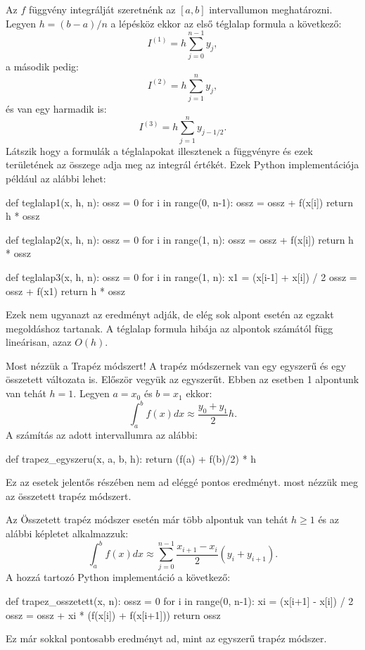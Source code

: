 Az
\(f\) függvény integrálját szeretnénk az \([a ,b]\) intervallumon meghatározni. Legyen
\(h=(b - a)/n\) a lépésköz ekkor az első téglalap formula a következő:
\[
I^{(1)}= h  \sum^{n-1}_{j=0}y_j,
\]
a második pedig:
\[
I^{(2)}= h  \sum^{n}_{j=1}y_j,
\]
és van egy harmadik is:
\[
I^{(3)}= h  \sum^{n}_{j=1}y_{j-1/2}.
\]
Látszik hogy a formulák a téglalapokat illesztenek a függvényre és ezek
területének az összege adja meg az integrál értékét.
Ezek Python implementációja például az alábbi lehet:
\begin{python}
def teglalap1(x, h, n):
    ossz = 0
    for i in range(0, n-1):
        ossz = ossz + f(x[i])
    return h * ossz

def teglalap2(x, h, n):
    ossz = 0
    for i in range(1, n):
        ossz = ossz + f(x[i])
    return h * ossz

def teglalap3(x, h, n):
    ossz = 0
    for i in range(1, n):
        x1 = (x[i-1] + x[i]) / 2
        ossz = ossz + f(x1)
    return h * ossz
\end{python}    
    Ezek nem ugyanazt az eredményt adják, de elég sok alpont esetén
az egzakt megoldáshoz tartanak. A téglalap formula hibája az alpontok
számától függ lineárisan, azaz \(O(h)\).

    Most nézzük a Trapéz módszert! A trapéz módszernek van egy egyszerű és
egy összetett változata is. Először vegyük az egyszerűt. Ebben az
esetben 1 alpontunk van tehát \(h=1\). Legyen \(a=x_0\) és \(b=x_1\)
ekkor: \[
\int^b_a f(x)dx \approx \frac{y_0+y_1}{2}h.
\]
A számítás az adott intervallumra az alábbi:
\begin{python}
def trapez_egyszeru(x, a, b, h):  
    return (f(a) + f(b)/2) * h
\end{python}
    Ez az esetek jelentős részében nem ad eléggé pontos eredményt. most nézzük meg az összetett trapéz
módszert.

Az Összetett trapéz módszer esetén már több alpontuk van tehát
\(h\geq 1\) és az alábbi képletet alkalmazzuk:
\[
\int^b_a f(x)dx \approx \sum^{n-1}_{j=0}\frac{x_{i+1}-x_i}{2}(y_i+y_{i+1}).
\]
A hozzá tartozó Python implementáció a következő:
\begin{python}
def trapez_osszetett(x, n):
    ossz = 0
    for i in range(0, n-1):
        xi = (x[i+1] - x[i]) / 2
        ossz = ossz + xi * (f(x[i]) + f(x[i+1]))
    return ossz
\end{python}
    Ez már sokkal pontosabb eredményt ad, mint az egyszerű trapéz
módszer.

